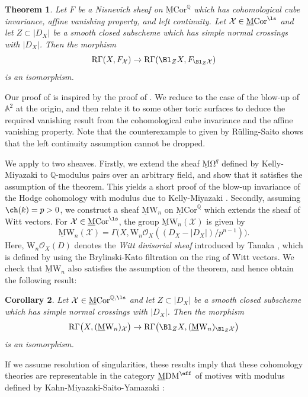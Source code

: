 \documentclass{amsart}
\theoremstyle{plain}
\newtheorem{theorem}{Theorem}[section]
\newtheorem{corollary}[theorem]{Corollary}
\theoremstyle{definition}
\theoremstyle{remark}
\numberwithin{equation}{section}
\def\RGamma{\mathrm{R}\Gamma}
\def\MCor{\mathrm{\underline{M}Cor}}
\def\MDM{\mathrm{\underline{M}DM}}
\def\MOmega{\mathrm{\underline{M}\Omega}}
\def\MW{\underline{\mathrm{M}}\mathrm{W}}
\begin{document}
\begin{theorem}\label{main}
    Let $F$ be a Nisnevich sheaf on $\MCor^\mathbb{Q}$ which has cohomological cube invariance, affine vanishing property, and left continuity.
    Let $\mathcal{X}\in \MCor^\ls$ and let $Z\subset |D_X|$ be a smooth closed subscheme which has simple normal crossings with $|D_X|$.
    Then the morphism
    $$
        \RGamma(X,F_\mathcal{X})\to \RGamma(\Bl_ZX,F_{\Bl_Z\mathcal{X}})
    $$
    is an isomorphism.
\end{theorem}

Our proof of  is inspired by the proof of \cite[Theorem 2.12]{BRS}.
We reduce to the case of the blow-up of $\mathbb{A}^2$ at the origin, and then relate it to some other toric surfaces to deduce the required vanishing result from the cohomological cube invariance and the affine vanishing property.
Note that the counterexample to  given by R\"ulling-Saito \cite[Section 6.9]{RSram3} shows that the left continuity assumption cannot be dropped.

We apply  to two sheaves.
Firstly, we extend the sheaf $\MOmega^q$ defined by Kelly-Miyazaki to $\mathbb{Q}$-modulus pairs over an arbitrary field, and show that it satisfies the assumption of the theorem.
This yields a short proof of the blow-up invariance of the Hodge cohomology with modulus due to Kelly-Miyazaki \cite[Theorem 6.1]{KellyMiyazaki_Hodge2}.
Secondly, assuming $\ch(k)=p>0$, we construct a sheaf $\MW_n$ on $\MCor^\mathbb{Q}$ which extends the sheaf of Witt vectors.
For $\mathcal{X}\in \MCor^\ls$, the group $\MW_n(\mathcal{X})$ is given by
$$
	\MW_n(\mathcal{X})=\Gamma\bigl(X,\mathrm{W}_n\mathcal{O}_X((D_X-|D_X|)/p^{n-1})\bigr).
$$
Here, $\mathrm{W}_n\mathcal{O}_X(D)$ denotes the \emph{Witt divisorial sheaf} introduced by Tanaka \cite{Tanaka_Witt}, which is defined by using the Brylinski-Kato filtration on the ring of Witt vectors.
We check that $\MW_n$ also satisfies the assumption of the theorem, and hence obtain the following result:
\begin{corollary}\label{Witt_CBI}
    Let $\mathcal{X}\in \MCor^{\mathbb{Q},\ls}$ and let $Z\subset |D_X|$ be a smooth closed subscheme which has simple normal crossings with $|D_X|$.
    Then the morphism
    $$
        \RGamma\bigl(X,(\MW_n)_\mathcal{X}\bigr)\to \RGamma\bigl(\Bl_ZX,(\MW_n)_{\Bl_Z\mathcal{X}}\bigr)
    $$
    is an isomorphism.
\end{corollary}

If we assume resolution of singularities, these results imply that these cohomology theories are representable in the category $\MDM^\eff$ of motives with modulus defined by Kahn-Miyazaki-Saito-Yamazaki \cite{KMSY3}:
\end{document}
